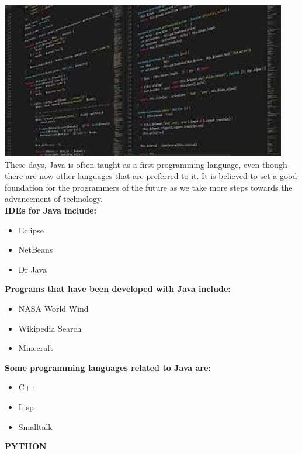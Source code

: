 \documentclass{article}
\begin{document}
	\includegraphics[width=0.5\linewidth]{picture200}\\
	These days, Java is often taught as a first programming language, even though there are now other languages that are preferred to it. It is believed to set a good foundation for the programmers of the future as we take more steps towards the advancement of technology.\\
	\textbf{IDEs for Java include:}
	\begin{itemize}
		\item Eclipse
		\item NetBeans
		\item Dr Java
	\end{itemize}
	\textbf{Programs that have been developed with Java include:}
	\begin{itemize}
		\item NASA World Wind
		\item Wikipedia Search
		\item Minecraft
	\end{itemize}
\textbf{Some programming languages related to Java are:}
\begin{itemize}
	\item C++
	\item Lisp
	\item Smalltalk
\end{itemize}

\textbf{PYTHON}\\
\end{document}
